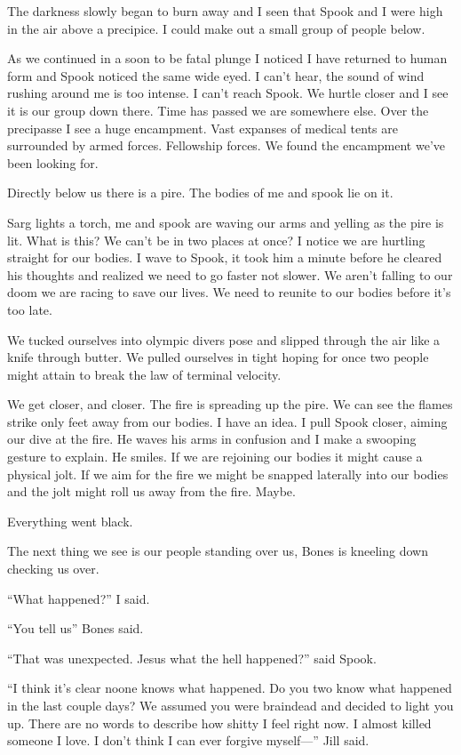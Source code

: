 The darkness slowly began to burn away and I seen that Spook and I were high in the air above a precipice. I could make out a small group of people below.

As we continued in a soon to be fatal plunge I noticed I have returned to human form and Spook noticed the same wide eyed. I can't hear, the sound of wind rushing around me is too intense. I can't reach Spook. We hurtle closer and I see it is our group down there. Time has passed we are somewhere else. Over the precipasse I see a huge encampment. Vast expanses of medical tents are surrounded by armed forces. Fellowship forces. We found the encampment we've been looking for.

Directly below us there is a pire. The bodies of me and spook lie on it.

Sarg lights a torch, me and spook are waving our arms and yelling as the pire is lit. What is this? We can't be in two places at once? I notice we are hurtling straight for our bodies. I wave to Spook, it took him a minute before he cleared his thoughts and realized we need to go faster not slower. We aren't falling to our doom we are racing to save our lives. We need to reunite to our bodies before it's too late.

We tucked ourselves into olympic divers pose and slipped through the air like a knife through butter. We pulled ourselves in tight hoping for once two people might attain to break the law of terminal velocity.

We get closer, and closer. The fire is spreading up the pire. We can see the flames strike only feet away from our bodies. I have an idea. I pull Spook closer, aiming our dive at the fire. He waves his arms in confusion and I make a swooping gesture to explain. He smiles. If we are rejoining our bodies it might cause a physical jolt. If we aim for the fire we might be snapped laterally into our bodies and the jolt might roll us away from the fire. Maybe.

Everything went black.

The next thing we see is our people standing over us, Bones is kneeling down checking us over.

``What happened?'' I said.

``You tell us'' Bones said.

``That was unexpected. Jesus what the hell happened?'' said Spook.

``I think it's clear noone knows what happened. Do you two know what happened in the last couple days? We assumed you were braindead and decided to light you up. There are no words to describe how shitty I feel right now. I almost killed someone I love. I don't think I can ever forgive myself---'' Jill said.

